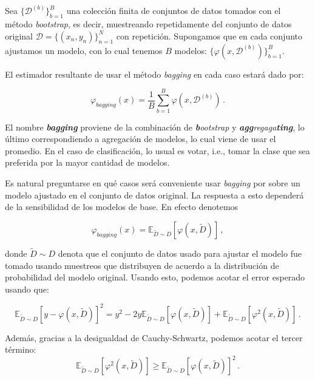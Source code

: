 Sea $\{\mathcal{D}^{(b)}\}^B_{b=1}$ una colección finita de conjuntos de datos tomados con el método \textit{bootstrap}, es decir, muestreando repetidamente del conjunto de datos original $ \mathcal{D} = \{(x_n,y_n)\}^N_{n=1}$ con repetición. Supongamos que en cada conjunto ajustamos un modelo, con lo cual tenemos $B$ modelos: $\{ \varphi(x,\mathcal{D}^{(b)}) \}^B_{b=1}$.

El estimador resultante de usar el método \textit{bagging} en cada caso estará dado por:

\begin{equation}
    \varphi_{bagging}(x) = \frac{1}{B} \sum^B_{b=1} \varphi(x,\mathcal{D}^{(b)}) \,.
\end{equation}

El nombre \textbf{\textit{bagging}} proviene de la combinación de \textit{\textbf{b}ootstrap} y \textit{\textbf{agg}regaga\textbf{ting}}, lo último correspondiendo a agregación de modelos, lo cual viene de usar el promedio. En el caso de clasificación, lo usual es votar, i.e., tomar la clase que sea preferida por la mayor cantidad de modelos.

Es natural preguntarse en qué casos será conveniente usar \textit{bagging} por sobre un modelo ajustado en el conjunto de datos original. La respuesta a esto dependerá de la sensibilidad de los modelos de base. En efecto denotemos 

\begin{equation}
    \varphi_{bagging}(x) = \mathbb{E}_{ \tilde D \sim D } \left[ \varphi(x,\tilde D) \right] \,,
\end{equation}

donde $\tilde D \sim D$ denota que el conjunto de datos usado para ajustar el modelo fue tomado usando muestreos que distribuyen de acuerdo a la distribución de probabilidad del modelo original. Usando esto, podemos acotar el error esperado usando que:

\begin{equation}
    \mathbb{E}_{ \tilde D \sim D } \left[ y - \varphi(x,\tilde D) \right]^2 = y^2 - 2 y \mathbb{E}_{ \tilde D \sim D } \left[\varphi(x,\tilde D) \right] + \mathbb{E}_{ \tilde D \sim D } \left[\varphi^2(x,\tilde D) \right] \,.
\end{equation}

Además, gracias a la desigualdad de Cauchy-Schwartz, podemos acotar el tercer término: 
\begin{equation}
\label{eq:bagging_CS}
    \mathbb{E}_{ \tilde D \sim D } \left[\varphi^2(x,\tilde D) \right] \geq \mathbb{E}_{ \tilde D \sim D } \left[\varphi(x,\tilde D) \right]^2 \,.
\end{equation}

